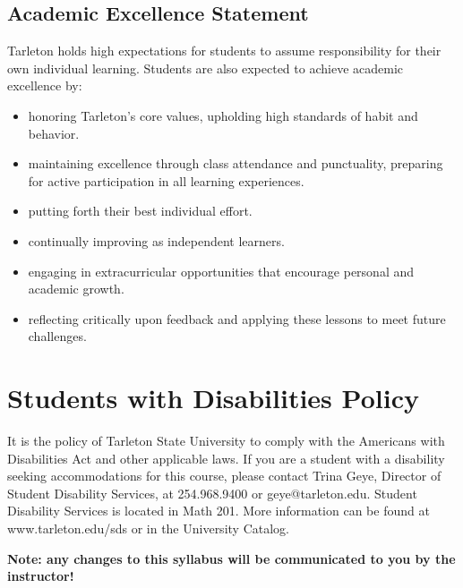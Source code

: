 \documentclass[10pt]{article}
\begin{document}
\subsection*{Academic Excellence Statement}
\label{sec-9-3}
Tarleton holds high expectations for students to assume responsibility for their own individual learning. Students are also expected to achieve academic excellence by:
\begin{itemize}
\item honoring Tarleton’s core values, upholding high standards of habit and behavior.
\item maintaining excellence through class attendance and punctuality, preparing for active participation in all learning experiences.
\item putting forth their best individual effort.
\item continually improving as independent learners.
\item engaging in extracurricular opportunities that encourage personal and academic growth.
\item reflecting critically upon feedback and applying these lessons to meet future challenges.
\end{itemize}

\section*{Students with Disabilities Policy}
\label{sec-10}

It is the policy of Tarleton State University to comply with the Americans
with Disabilities Act and other applicable laws. If you are a student with a
disability seeking accommodations for this course, please contact Trina
Geye, Director of Student Disability Services, at 254.968.9400 or
geye@tarleton.edu. Student Disability Services is
located in Math 201. More information can be found at www.tarleton.edu/sds or in the University Catalog.


\textbf{\textbf{Note:  any changes to this syllabus will be communicated to you by the instructor!}}
\end{document}
